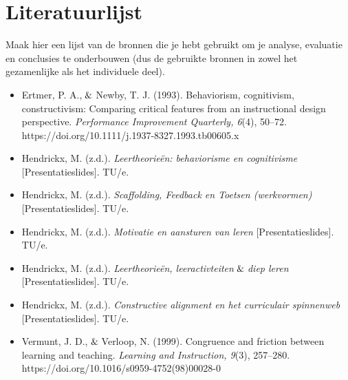 \documentclass{article}
\begin{document}
            \section{Literatuurlijst}
                Maak hier een lijst van de bronnen die je hebt gebruikt om je analyse, evaluatie en conclusies te onderbouwen (dus de gebruikte bronnen in zowel het gezamenlijke als het individuele deel).
                \begin{itemize}
                    \item Ertmer, P. A.,$\And$Newby, T. J. (1993). Behaviorism, cognitivism, constructivism: Comparing critical features from an instructional design perspective. \textit{Performance Improvement Quarterly, 6}(4), 50–72. https://doi.org/10.1111/j.1937-8327.1993.tb00605.x
                    \item Hendrickx, M. (z.d.). \textit{Leertheorieën: behaviorisme en cognitivisme} [Presentatieslides]. TU/e.
                    \item Hendrickx, M. (z.d.). \textit{Scaffolding, Feedback en Toetsen (werkvormen)} [Presentatieslides]. TU/e.
                    \item Hendrickx, M. (z.d.). \textit{Motivatie en aansturen van leren} [Presentatieslides]. TU/e.
                    \item Hendrickx, M. (z.d.). \textit{Leertheorieën, leeractivteiten$\And$diep leren} [Presentatieslides]. TU/e.
                    \item Hendrickx, M. (z.d.). \textit{Constructive alignment en het curriculair spinnenweb} [Presentatieslides]. TU/e.
                    \item Vermunt, J. D.,$\And$Verloop, N. (1999). Congruence and friction between learning and teaching. \textit{Learning and Instruction, 9}(3), 257–280. https://doi.org/10.1016/s0959-4752(98)00028-0
                \end{itemize}
\end{document}
